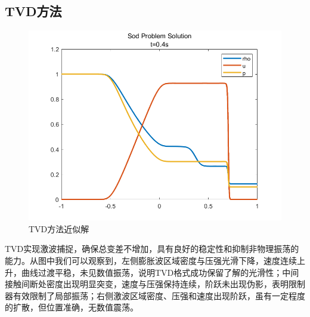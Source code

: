 \documentclass[12pt,a4paper]{article}%
\begin{document}
		\subsection{TVD方法}
		\begin{figure}[H]
			\centering
			\begin{minipage}{0.83\textwidth}
				\centering
				\includegraphics[width=\textwidth]{./fig/app3.png}
				\caption{\fontsize{10pt}{15pt}\selectfont TVD方法近似解}
			\end{minipage}
		\end{figure}
		TVD实现激波捕捉，确保总变差不增加，具有良好的稳定性和抑制非物理振荡的能力。从图中我们可以观察到，左侧膨胀波区域密度与压强光滑下降，速度连续上升，曲线过渡平稳，未见数值振荡，说明TVD格式成功保留了解的光滑性；中间接触间断处密度出现明显突变，速度与压强保持连续，阶跃未出现伪影，表明限制器有效限制了局部振荡；右侧激波区域密度、压强和速度出现阶跃，虽有一定程度的扩散，但位置准确，无数值震荡。
			
\end{document}
